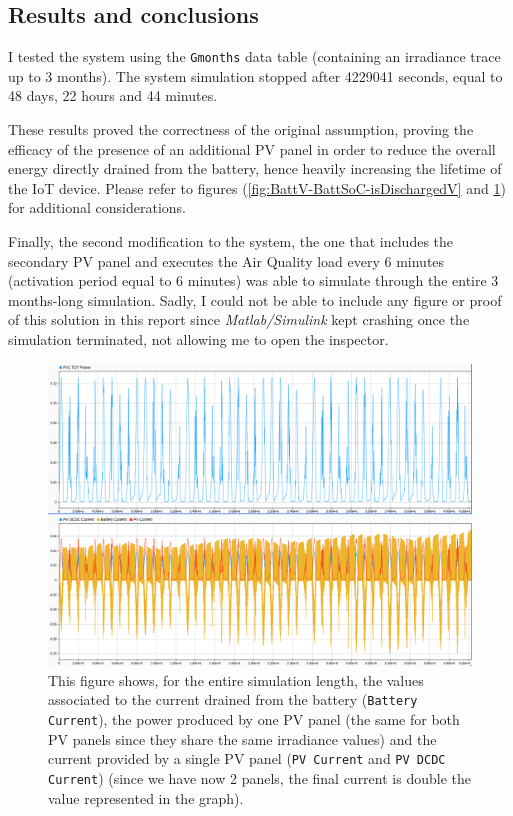 \documentclass[a4paper]{article}
\begin{document}
    \subsection{Results and conclusions}
        I tested the system using the \texttt{Gmonths} data table (containing an irradiance trace up to 3 months).
        The system simulation stopped after 4229041 seconds, equal to 48 days, 22 hours and 44 minutes.
        
        These results proved the correctness of the original assumption, proving the efficacy of the presence of an additional PV panel in order to reduce the overall energy directly drained from the battery, hence heavily increasing the lifetime of the IoT device.
        Please refer to figures (\ref{fig:BattV-BattSoC-isDischargedV} and \ref{fig:PVTotPower-Currents_Overall}) for additional considerations.

        Finally, the second modification to the system, the one that includes the secondary PV panel and executes the Air Quality load every 6 minutes (activation period equal to 6 minutes) was able to simulate through the entire 3 months-long simulation. Sadly, I could not be able to include any figure or proof of this solution in this report since \emph{Matlab/Simulink} kept crashing once the simulation terminated, not allowing me to open the inspector.

        \begin{figure}[htp]
            \centering
            \includegraphics[width=0.8 \columnwidth]{./screenshots/SecondPart/2Minutes/Gmonths/PVTotPower-Currents_Overall.png}
            \caption{
                    \label{fig:PVTotPower-Currents_Overall}
                    This figure shows, for the entire simulation length, the values associated to the current drained from the battery (\texttt{Battery Current}), the power produced by one PV panel (the same for both PV panels since they share the same irradiance values) and the current provided by a single PV panel (\texttt{PV Current} and \texttt{PV DCDC Current}) (since we have now 2 panels, the final current is double the value represented in the graph).
            }
        \end{figure}
\end{document}
